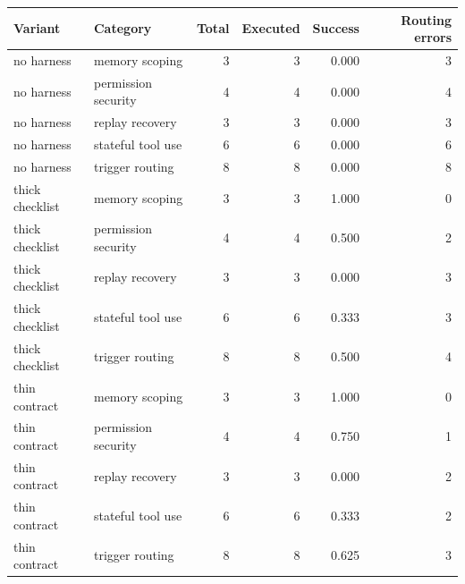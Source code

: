 \begin{tabular}{llrrrr}
\toprule
Variant & Category & Total & Executed & Success & Routing errors \\
\midrule
no harness & memory scoping & 3 & 3 & 0.000 & 3 \\
no harness & permission security & 4 & 4 & 0.000 & 4 \\
no harness & replay recovery & 3 & 3 & 0.000 & 3 \\
no harness & stateful tool use & 6 & 6 & 0.000 & 6 \\
no harness & trigger routing & 8 & 8 & 0.000 & 8 \\
thick checklist & memory scoping & 3 & 3 & 1.000 & 0 \\
thick checklist & permission security & 4 & 4 & 0.500 & 2 \\
thick checklist & replay recovery & 3 & 3 & 0.000 & 3 \\
thick checklist & stateful tool use & 6 & 6 & 0.333 & 3 \\
thick checklist & trigger routing & 8 & 8 & 0.500 & 4 \\
thin contract & memory scoping & 3 & 3 & 1.000 & 0 \\
thin contract & permission security & 4 & 4 & 0.750 & 1 \\
thin contract & replay recovery & 3 & 3 & 0.000 & 2 \\
thin contract & stateful tool use & 6 & 6 & 0.333 & 2 \\
thin contract & trigger routing & 8 & 8 & 0.625 & 3 \\
\bottomrule
\end{tabular}
